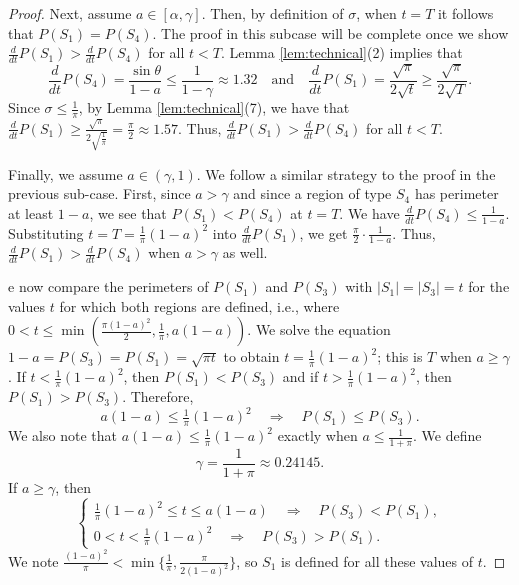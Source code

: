 \documentclass[leqno]{article}
\numberwithin{equation}{section}
\theoremstyle{definition}
\theoremstyle{remark}
\theoremstyle{plain}
\begin{document}
\begin{proof}
Next, assume $a\in [\alpha,\gamma]$.  Then, by definition of $\sigma$, when $t= T$ it follows that $P(S_1) = P(S_4)$.  The proof in this subcase will be complete once we show $\frac{d}{dt} P(S_1) > \frac{d}{dt} P(S_4)$ for all $t < T$.   Lemma \ref{lem:technical}(2) implies that 
\begin{equation*}
\frac{d}{dt} P(S_4)  = \frac{\sin \theta}{1-a} \leq \frac{1}{1-\gamma}\approx 1.32\quad\textrm{and}\quad\frac{d}{dt} P(S_1) = \frac{\sqrt{\pi}}{2\sqrt{t}} \geq \frac{\sqrt{\pi}}{2\sqrt{T}}.
\end{equation*}
Since $\sigma\leq \frac{1}{\pi}$, by Lemma \ref{lem:technical}(7), we have that $\frac{d}{dt} P(S_1) \geq \frac{\sqrt{\pi}}{2\sqrt{\frac{1}{\pi}}} = \frac{\pi}{2} \approx 1.57$.  Thus, $\frac{d}{dt} P(S_1) > \frac{d}{dt} P(S_4)$ for all $t< T$.

Finally, we assume $a\in (\gamma,1)$.  We follow a similar strategy to the proof in the previous sub-case.  First, since $a > \gamma$ and since a region of type $S_4$ has perimeter at least $1-a$, we see that $P(S_1) < P(S_4)$ at $t= T$. We have $\frac{d}{dt} P(S_4)\leq \frac{1}{1-a}$.  Substituting $t = T = \frac{1}{\pi}(1-a)^2$ into $\frac{d}{dt} P(S_1)$, we get $\frac{\pi}{2}\cdot\frac{1}{1-a}$.  Thus, $\frac{d}{dt} P(S_1) > \frac{d}{dt} P(S_4)$ when $a > \gamma$ as well.



\iffalse e now compare the perimeters of $P(S_1)$ and $P(S_3)$ with $|S_1|=|S_3|=t$ for the values $t$ for which both regions are defined, i.e., where $0<t\leq \min(\tfrac{\pi(1-a)^2}{2},\tfrac{1}{\pi},a(1-a))$. We solve the equation $1-a=P(S_3)=P(S_1)=\sqrt{\pi t}$ to obtain $t=\tfrac{1}{\pi}(1-a)^2$; this is $T$ when $a\geq \gamma$.  If $t< \frac{1}{\pi}(1-a)^2$, then $P(S_1) < P(S_3)$ and if $t > \frac{1}{\pi}(1-a)^2$, then $P(S_1) > P(S_3)$. Therefore, 
\begin{equation*}
a(1-a)\leq \tfrac{1}{\pi}(1-a)^2\quad\Longrightarrow\quad P(S_1)\leq P(S_3).
\end{equation*}
We also note that $a(1-a)\leq \tfrac{1}{\pi}(1-a)^2$ exactly when $a\leq \tfrac{1}{1+\pi}$. We define
\begin{equation}
\gamma=\frac{1}{1+\pi}\approx 0.24145.
\end{equation}
If $a\geq \gamma$, then 
\begin{equation*}
\begin{cases}
\frac{1}{\pi}(1-a)^2 \leq t\leq a(1-a)\quad\Longrightarrow\quad P(S_3) < P(S_1),\\
0 < t < \frac{1}{\pi}(1-a)^2\quad\Longrightarrow\quad P(S_3)>P(S_1).
\end{cases}
\end{equation*}
We note $\tfrac{(1-a)^2}{\pi} < \min \{ \tfrac{1}{\pi},  \tfrac{\pi}{2(1-a)^2}\}$, so  $S_1$ is defined for all these values of $t$.


\end{proof}
\end{document}
